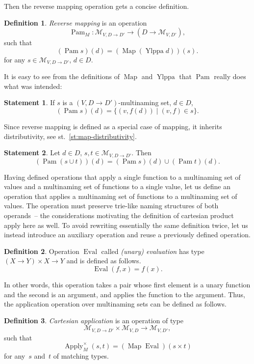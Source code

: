 \documentclass{article}
\theoremstyle{definition}
\newtheorem{Df}{Definition}
\newtheorem{St}{Statement}
\newcommand{\setcharmvcn}{M}
\newcommand{\setsymbol}[3]{\mathcal{#1}_{#2,#3}}
\newcommand{\setmvcn}[2]{\setsymbol{\setcharmvcn}{#1}{#2}}
\newcommand{\fmap}{\operatorname{Map}}
\newcommand{\fpam}{\operatorname{Pam}}
\newcommand{\apply}{\operatorname{Apply}}
\newcommand{\ylppa}{\operatorname{Ylppa}}
\newcommand{\eval}{\operatorname{Eval}}
\begin{document}
Then the reverse mapping operation gets a concise definition.

\begin{Df}\label{df:mvcn-pam}
\emph{Reverse mapping} is an operation
\[
  \fpam_{\setcharmvcn} : \setmvcn{V}{D \to D'} \to (D \to \setmvcn{V}{D'}),
\]
such that
\[
  (\fpam s)(d) = (\fmap (\ylppa d))(s) .
\]
for any $s\in \setmvcn{V}{D \to D'}$, $d\in D$.
\end{Df}

It is easy to see from the definitions of $\fmap$ and $\ylppa$ that $\fpam$
really does what was intended:

\begin{St}\label{st:mvcn-pam}
If $s$ is a $(V, D\to D')$-multinaming set, $d\in D$,
\[
  (\fpam s)(d) = \{ (v, f(d)) \mid (v, f) \in s \} .
\]
\end{St}

Since reverse mapping is defined as a special case of mapping, it inherits
distributivity, see st.~\ref{st:map-distributivity}.

\begin{St}\label{st:pam-distributivity}
Let $d\in D$, $s, t \in \setmvcn{V}{D \to D'}$. Then
\[
  (\fpam (s \cup t))(d) = (\fpam s)(d) \cup (\fpam t)(d) .
\]
\end{St}

Having defined operations that apply a single function to a multinaming set of values
and a multinaming set of functions to a single value, let us define an
operation that applies a multinaming set of functions to a multinaming set of values. The
operation must preserve trie-like naming structures of both operands~-- the
considerations motivating the definition of cartesian product apply here
as well. To avoid rewriting essentially the same definition twice, let us
instead introduce an auxiliary operation and reuse a previously defined
operation.

\begin{Df}\label{df:eval}
Operation $\eval$ called \emph{(unary) evaluation} has type
$(X \to Y) \times X \to Y$ and is defined as follows.
\[
  \eval (f, x) = f(x) .
\]
\end{Df}

In other words, this operation takes a pair whose first element is a unary
function and the second is an argument, and applies the function to the
argument. Thus, the application operation over multinaming sets can be defined as
follows.

\begin{Df}\label{df:mvcn-apply-cartesian}
\emph{Cartesian application} is an operation of type
\[
\setmvcn{V}{D\to D'} \times \setmvcn{V}{D} \to \setmvcn{V}{D'} ,
\]
such that
\[
  \apply_{\setcharmvcn}^{\times} (s, t) = (\fmap \eval) (s \times t)
\]
for any~$s$ and~$t$ of matching types.
\end{Df}
\end{document}
